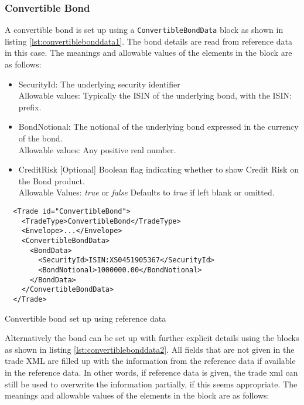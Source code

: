 \subsubsection{Convertible Bond}
\label{ss:convertible_bond}

A convertible bond is set up using a {\tt ConvertibleBondData} block as shown in listing
\ref{lst:convertiblebonddata1}. The bond details are read from reference data in this case. The meanings and allowable
values of the elements in the block are as follows:

\begin{itemize}
  \item SecurityId: The underlying security identifier\\
      Allowable values:  Typically the ISIN of the underlying bond, with the ISIN: prefix.
  \item BondNotional: The notional of the underlying bond expressed in the currency of the bond.\\
      Allowable values:  Any positive real number.
    \item CreditRisk [Optional] Boolean flag indicating whether to show Credit Risk on the Bond product. \\
      Allowable Values: \emph{true} or \emph{false} Defaults to \emph{true} if left blank or omitted.          
\end{itemize}

\begin{listing}[H]
\begin{verbatim}
  <Trade id="ConvertibleBond">
    <TradeType>ConvertibleBond</TradeType>
    <Envelope>...</Envelope>
    <ConvertibleBondData>
      <BondData>
        <SecurityId>ISIN:XS0451905367</SecurityId>
        <BondNotional>1000000.00</BondNotional>
      </BondData>
    </ConvertibleBondData>
  </Trade>
\end{verbatim}
\caption{Convertible bond set up using reference data}
\label{lst:convertiblebonddata1}
\end{listing}

Alternatively the bond can be set up with further explicit details using the blocks as shown in listing
\ref{lst:convertiblebonddata2}. All fields that are not given in the trade XML are filled up with the information from
the reference data if available in the reference data. In other words, if reference data is given, the trade xml can
still be used to overwrite the information partially, if this seems appropriate. The meanings and allowable values of
the elements in the block are as follows:


